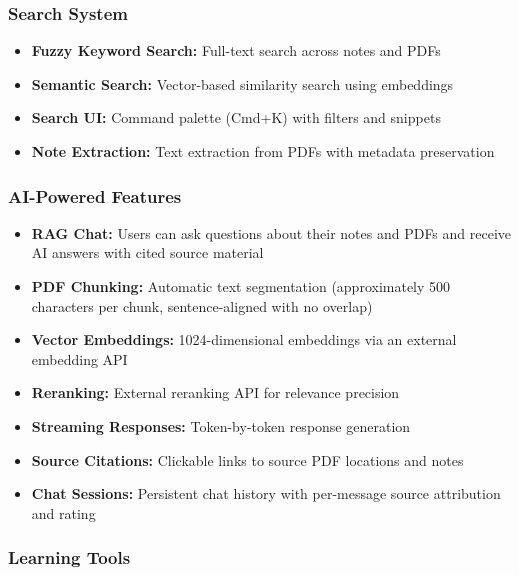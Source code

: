 \documentclass[12pt,a4paper]{article}
\begin{document}
\subsubsection{Search System}

\begin{itemize}
    \item \textbf{Fuzzy Keyword Search:} Full-text search across notes and PDFs
    \item \textbf{Semantic Search:} Vector-based similarity search using embeddings
    \item \textbf{Search UI:} Command palette (Cmd+K) with filters and snippets
    \item \textbf{Note Extraction:} Text extraction from PDFs with metadata preservation
\end{itemize}

\subsubsection{AI-Powered Features}

\begin{itemize}
    \item \textbf{RAG Chat:} Users can ask questions about their notes and PDFs and receive AI answers with cited source material
    \item \textbf{PDF Chunking:} Automatic text segmentation (approximately 500 characters per chunk, sentence-aligned with no overlap)
    \item \textbf{Vector Embeddings:} 1024-dimensional embeddings via an external embedding API
    \item \textbf{Reranking:} External reranking API for relevance precision
    \item \textbf{Streaming Responses:} Token-by-token response generation
    \item \textbf{Source Citations:} Clickable links to source PDF locations and notes
    \item \textbf{Chat Sessions:} Persistent chat history with per-message source attribution and rating
\end{itemize}

\subsubsection{Learning Tools}
\end{document}
